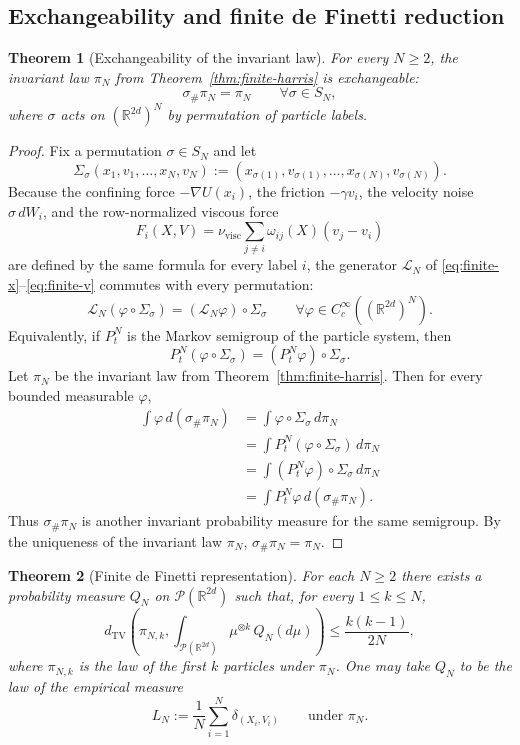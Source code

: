 \documentclass[11pt]{article}
\newtheorem{theorem}{Theorem}[section]
\theoremstyle{definition}
\theoremstyle{remark}
\newcommand{\R}{\mathbb{R}}
\newcommand{\TV}{\mathrm{TV}}
\newcommand{\mcP}{\mathcal{P}}
\begin{document}
\subsection{Exchangeability and finite de Finetti reduction}

\begin{theorem}[Exchangeability of the invariant law]\label{thm:exchangeable}
For every $N\geq2$, the invariant law $\pi_N$ from
Theorem~\ref{thm:finite-harris} is exchangeable:
\[
\sigma_\#\pi_N=\pi_N
\qquad
\forall \sigma\in S_N,
\]
where $\sigma$ acts on $(\R^{2d})^N$ by permutation of particle labels.
\end{theorem}

\begin{proof}
Fix a permutation $\sigma\in S_N$ and let
\[
\Sigma_\sigma(x_1,v_1,\dots,x_N,v_N)
:=
(x_{\sigma(1)},v_{\sigma(1)},\dots,x_{\sigma(N)},v_{\sigma(N)}).
\]
Because the confining force $-\nabla U(x_i)$, the friction $-\gamma v_i$, the
velocity noise $\sigma\,dW_i$, and the row-normalized viscous force
\[
F_i(X,V)=\nu_{\mathrm{visc}}\sum_{j\neq i}\omega_{ij}(X)(v_j-v_i)
\]
are defined by the same formula for every label $i$, the generator
$\mathcal L_N$ of \eqref{eq:finite-x}--\eqref{eq:finite-v} commutes with every
permutation:
\[
\mathcal L_N(\varphi\circ \Sigma_\sigma)
=
(\mathcal L_N\varphi)\circ \Sigma_\sigma
\qquad
\forall \varphi\in C_c^\infty((\R^{2d})^N).
\]
Equivalently, if $P_t^N$ is the Markov semigroup of the particle system, then
\[
P_t^N(\varphi\circ \Sigma_\sigma)=(P_t^N\varphi)\circ \Sigma_\sigma.
\]
Let \(\pi_N\) be the invariant law from Theorem~\ref{thm:finite-harris}. Then
for every bounded measurable \(\varphi\),
\begin{align*}
\int \varphi\,d(\sigma_\#\pi_N)
&=
\int \varphi\circ\Sigma_\sigma\,d\pi_N\\
&=
\int P_t^N(\varphi\circ\Sigma_\sigma)\,d\pi_N\\
&=
\int (P_t^N\varphi)\circ\Sigma_\sigma\,d\pi_N\\
	&=
	\int P_t^N\varphi\,d(\sigma_\#\pi_N).
	\end{align*}
	Thus $\sigma_\#\pi_N$ is another invariant probability measure for the same
	semigroup. By the uniqueness of the invariant law $\pi_N$,
	$\sigma_\#\pi_N=\pi_N$.
\end{proof}

\begin{theorem}[Finite de Finetti representation]\label{thm:definetti}
For each $N\geq2$ there exists a probability measure $Q_N$ on
$\mcP(\R^{2d})$ such that, for every $1\leq k\leq N$,
\[
d_{\TV}\!\left(\pi_{N,k},\int_{\mcP(\R^{2d})}\mu^{\otimes k}\,Q_N(d\mu)\right)
\leq
\frac{k(k-1)}{2N},
\]
where $\pi_{N,k}$ is the law of the first $k$ particles under $\pi_N$. One may
take $Q_N$ to be the law of the empirical measure
\[
L_N:=\frac1N\sum_{i=1}^N \delta_{(X_i,V_i)}
\qquad
\text{under }\pi_N.
\]
\end{theorem}
\end{document}
